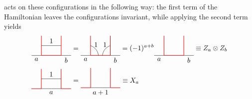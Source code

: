 acts on these configurations in the following way: the first term of the Hamiltonian leaves the configurations invariant, while applying the second term yields
	\begin{align}\label{eq:action}
		\begin{tikzpicture}[scale=1,baseline=(current bounding box.center)]
			\draw (-0.5,0) to node [below] {$a$} (0,0);
			\draw [red, line width=0.25mm] (0,0) -- (1,0);
			\draw (1,0) to node [below] {$b$} (1.5,0);
			\draw [red, line width=0.25mm] (0,0) -- (0,1);
			\draw (0,0.5) to node[above] {$1$} (1,0.5);
			\draw [red, line width=0.25mm] (1,0) -- (1,1);
		\end{tikzpicture}&=
		\begin{tikzpicture}[scale=1,baseline=(current bounding box.center)]
			\draw (-0.5,0) to node [below] {$a$} (0,0);
			\draw [red, line width=0.25mm] (0,0) -- (1,0);
			\draw (1,0) to node [below] {$b$} (1.5,0);
			\draw [red, line width=0.25mm] (0,0) -- (0,1);
			\draw [red, line width=0.25mm] (1,0) -- (1,1);
			\draw (0,0.5) to[bend left] node[above] {$1$} (0.4,0);
			\draw (1,0.5) to[bend right] node[above] {$1$} (0.6,0);
		\end{tikzpicture}=(-1)^{a+b}
		\begin{tikzpicture}[scale=1,baseline=(current bounding box.center)]
			\draw (-0.5,0) to node [below] {$a$} (0,0);
			\draw [red, line width=0.25mm] (0,0) -- (1,0);
			\draw (1,0) to node [below] {$b$} (1.5,0);
			\draw [red, line width=0.25mm] (0,0) -- (0,1);
			\draw [red, line width=0.25mm] (1,0) -- (1,1);
		\end{tikzpicture}\equiv Z_a\otimes Z_b\\\label{eq:action2}
		\begin{tikzpicture}[scale=1,baseline=(current bounding box.center)]
			\draw [red, line width=0.25mm] (-0.5,0) -- (0,0);
			\draw (0,0) to node[below] {$a$} (1,0);
			\draw [red, line width=0.25mm] (1,0) -- (1.5,0);
			\draw [red, line width=0.25mm] (0,0) -- (0,1);
			\draw [red, line width=0.25mm] (1,0) -- (1,1);
			\draw (0,0.5) to node[above] {$1$} (1,0.5);
		\end{tikzpicture}&=
		\begin{tikzpicture}[scale=1,baseline=(current bounding box.center)]
			\draw [red, line width=0.25mm] (-0.5,0) -- (0,0);
			\draw (0,0) to node[below] {$a+1$} (1,0);
			\draw [red, line width=0.25mm] (1,0) -- (1.5,0);
			\draw [red, line width=0.25mm] (0,0) -- (0,1);
			\draw [red, line width=0.25mm] (1,0) -- (1,1);
		\end{tikzpicture}\equiv X_a
	\end{align}
